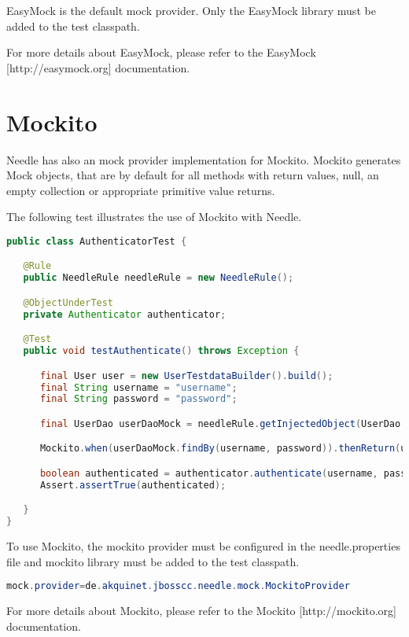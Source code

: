 EasyMock is the default mock provider. Only the EasyMock library must be added to the test classpath.

For more details about EasyMock, please refer to the EasyMock [http://easymock.org] documentation.

\section{Mockito}

Needle has also an mock provider implementation for Mockito. Mockito generates Mock objects, that are by default for all methods with return values, null, an empty collection or appropriate primitive value returns. 

The following test illustrates the use of Mockito with Needle. 

\begin{lstlisting}[language={JAVA},caption=Testing with Mockito]
public class AuthenticatorTest {

   @Rule
   public NeedleRule needleRule = new NeedleRule();

   @ObjectUnderTest
   private Authenticator authenticator;

   @Test
   public void testAuthenticate() throws Exception {

      final User user = new UserTestdataBuilder().build();
      final String username = "username";
      final String password = "password";

      final UserDao userDaoMock = needleRule.getInjectedObject(UserDao.class);

      Mockito.when(userDaoMock.findBy(username, password)).thenReturn(user);

      boolean authenticated = authenticator.authenticate(username, password);
      Assert.assertTrue(authenticated);

   }
}

\end{lstlisting}

To use Mockito, the mockito provider must be configured in the needle.properties file and mockito library must be added to the test classpath.

\begin{lstlisting}[language={JAVA},caption=Mockito configuration]
mock.provider=de.akquinet.jbosscc.needle.mock.MockitoProvider
\end{lstlisting}

For more details about Mockito, please refer to the Mockito [http://mockito.org] documentation.

